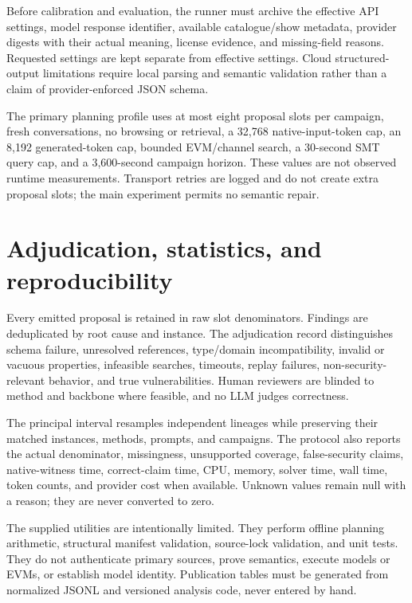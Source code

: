 \documentclass[11pt,a4paper]{article}
\begin{document}
Before calibration and evaluation, the runner must archive the effective API settings, model response identifier, available catalogue/show metadata, provider digests with their actual meaning, license evidence, and missing-field reasons. Requested settings are kept separate from effective settings. Cloud structured-output limitations require local parsing and semantic validation rather than a claim of provider-enforced JSON schema.

The primary planning profile uses at most eight proposal slots per campaign, fresh conversations, no browsing or retrieval, a 32,768 native-input-token cap, an 8,192 generated-token cap, bounded EVM/channel search, a 30-second SMT query cap, and a 3,600-second campaign horizon. These values are not observed runtime measurements. Transport retries are logged and do not create extra proposal slots; the main experiment permits no semantic repair.

\section{Adjudication, statistics, and reproducibility}

Every emitted proposal is retained in raw slot denominators. Findings are deduplicated by root cause and instance. The adjudication record distinguishes schema failure, unresolved references, type/domain incompatibility, invalid or vacuous properties, infeasible searches, timeouts, replay failures, non-security-relevant behavior, and true vulnerabilities. Human reviewers are blinded to method and backbone where feasible, and no LLM judges correctness.

The principal interval resamples independent lineages while preserving their matched instances, methods, prompts, and campaigns. The protocol also reports the actual denominator, missingness, unsupported coverage, false-security claims, native-witness time, correct-claim time, CPU, memory, solver time, wall time, token counts, and provider cost when available. Unknown values remain null with a reason; they are never converted to zero.

The supplied utilities are intentionally limited. They perform offline planning arithmetic, structural manifest validation, source-lock validation, and unit tests. They do not authenticate primary sources, prove semantics, execute models or EVMs, or establish model identity. Publication tables must be generated from normalized JSONL and versioned analysis code, never entered by hand.
\end{document}

